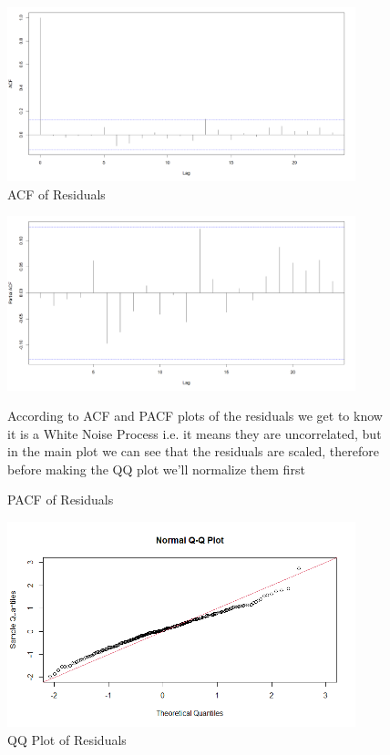 \documentclass{article}
\begin{document}
\begin{figure}[h]
    \centering
    \includegraphics[width=0.9\textwidth]{acf_residuals.png}
    \caption{ACF of Residuals}
    \label{fig:label8}
\end{figure}

\begin{figure}[h]
    \centering
    \includegraphics[width=0.9\textwidth]{pacf_residuals.png}
    \caption{PACF of Residuals}
    \vspace{1\baselineskip}
    \parbox{\linewidth}{According to ACF and PACF plots of the residuals we get to know it is a White Noise Process i.e. it means they are uncorrelated,
    but in the main plot we can see that the residuals are scaled, therefore before making the QQ plot we'll normalize them first}
    \label{fig:label9}
\end{figure}


\begin{figure}[h]
    \centering
    \includegraphics[width=0.9\textwidth]{qq_residuals.png}
    \caption{QQ Plot of Residuals}
    \label{fig:label10}
\end{figure}
\end{document}
